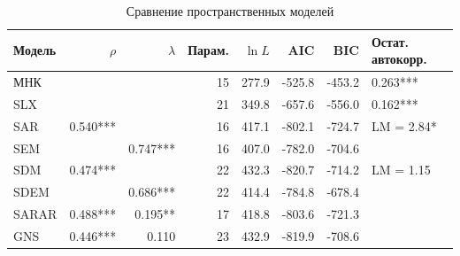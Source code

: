 \documentclass[12pt, a4paper]{article}
\begin{document}
\begin{table}[H]
    \centering
    \footnotesize
    \caption{Сравнение пространственных моделей}
    \label{tab:models}
    \begin{tabular}{lrrrrrrl}
        \toprule
        \textbf{Модель} & \textbf{$\rho$} & \textbf{$\lambda$} & \textbf{Парам.} & \textbf{$\ln L$} & \textbf{AIC} & \textbf{BIC} & \textbf{Остат. автокорр.} \\
        \midrule
        МНК &  &  & 15 & 277.9 & -525.8 & -453.2 & 0.263*** \\
        SLX &  &  & 21 & 349.8 & -657.6 & -556.0 & 0.162*** \\
        SAR & 0.540*** &  & 16 & 417.1 & -802.1 & -724.7 & LM = 2.84* \\
        SEM &  & 0.747*** & 16 & 407.0 & -782.0 & -704.6 &  \\
        SDM & 0.474*** &  & 22 & 432.3 & -820.7 & -714.2 & LM = 1.15 \\
        SDEM &  & 0.686*** & 22 & 414.4 & -784.8 & -678.4 &  \\
        SARAR & 0.488*** & 0.195** & 17 & 418.8 & -803.6 & -721.3 &  \\
        GNS & 0.446*** & 0.110 & 23 & 432.9 & -819.9 & -708.6 &  \\
        \bottomrule
    \end{tabular}
    \par\vspace{1mm}{\footnotesize Примечание: *, **, *** - значимость на уровнях 10\%, 5\% и 1\%. В последнем столбце для МНК и SLX приведен индекс Морана остатков, для SAR и SDM - LM-тест остаточной автокорреляции. Источник: расчеты авторов по данным X5 Group, Росстата и GeoNames.}
\end{table}
\end{document}
